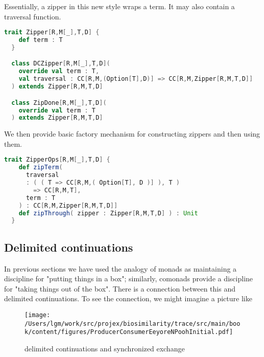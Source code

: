 Essentially, a zipper in this new style wraps a term. It may also
contain a traversal function.

\begin{lstlisting}[language=Scala,mathescape=true]  
  trait Zipper[R,M[_],T,D] {
    def term : T
  }

  class DCZipper[R,M[_],T,D](
    override val term : T,
    val traversal : CC[R,M,(Option[T],D)] => CC[R,M,Zipper[R,M,T,D]]
  ) extends Zipper[R,M,T,D]

  class ZipDone[R,M[_],T,D](
    override val term : T
  ) extends Zipper[R,M,T,D]
\end{lstlisting}

\break

We then provide basic factory mechanism for constructing zippers and
then using them.

\begin{lstlisting}[language=Scala,mathescape=true]
  trait ZipperOps[R,M[_],T,D] {
    def zipTerm(
      traversal
      : ( ( T => CC[R,M,( Option[T], D )] ), T )
        => CC[R,M,T],
      term : T
    ) : CC[R,M,Zipper[R,M,T,D]]
    def zipThrough( zipper : Zipper[R,M,T,D] ) : Unit
  }
\end{lstlisting}

\subsection{Delimited continuations}

In previous sections we have used the analogy of monads as maintaining
a discipline for "putting things in a box"; similarly, comonads
provide a discipline for "taking things out of the box". There is a
connection between this and delimited continuations. To see the
connection, we might imagine a picture like

\begin{figure}[tbp]
\begin{center}
{ \texttt{[image: /Users/lgm/work/src/projex/biosimilarity/trace/src/main/book/content/figures/ProducerConsumerEeyoreNPoohInitial.pdf]} }
\caption{ delimited continuations and synchronized exchange  }
\end{center}
\end{figure}

